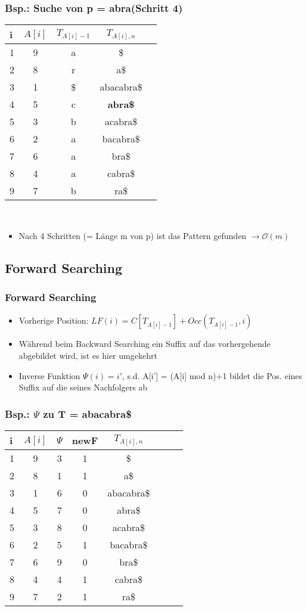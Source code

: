 \documentclass{beamer}
\begin{document}
\begin{frame}
\frametitle{Bsp.: Suche von p = \glqq abra\grqq  (Schritt 4)}
\begin{tabular}{l<{\ttfamily}|c<{\ttfamily} c<{\ttfamily}c<{\ttfamily} l<{\ttfamily}}
\textbf{i} & $A[i]$ & $T_{A[i]-1}$ & $T_{A[i],n}$\\\hline
1 & 9 & a & \$ \\
2 & 8 & r & a\$ \\
3 & 1 & \$ & abacabra\$ \\
4 & 5 & c & \color{red}\textbf{abra\$} \\
5 & 3 & b & acabra\$ \\
6 & 2 & a & bacabra\$ \\
7 & 6 & a & bra\$ \\
8 & 4 & a & cabra\$ \\
9 & 7 & b & ra\$ \\
\end{tabular}\\[5mm]
\begin{itemize}
\item Nach 4 Schritten (= Länge m von p) ist das Pattern gefunden $\rightarrow \mathcal{O}(m)$
\end{itemize}
\end{frame}
\begin{frame}
\subsection{Forward Searching}
\frametitle{Forward Searching}
\begin{itemize}
\item Vorherige Position: $LF(i) = C[T_{A[i]-1}] + Occ(T_{A[i]-1},i)$
\item Während beim Backward Searching ein Suffix auf das vorhergehende abgebildet wird, ist es hier umgekehrt
\item Inverse Funktion $\Psi(i) = i'$, s.d. A[i'] = (A[i] mod n)+1 bildet die Pos. eines Suffix auf die seines Nachfolgers ab
\end{itemize}
\end{frame}
\begin{frame}
\frametitle{Bsp.: $\Psi$ zu T = \glqq abacabra\$\grqq}
\begin{tabular}{l<{\ttfamily}|c<{\ttfamily} c<{\ttfamily}c<{\ttfamily} c<{\ttfamily}c<{\ttfamily}c<{\ttfamily} r<{\ttfamily}}
i & $A[i]$ & $\Psi$ & newF & $T_{A[i],n}$ \\\hline
1 & 9 & 3 & 1 &\$\\
2 & 8 & 1 & 1 &a\$\\
3 & 1 & 6 & 0 &abacabra\$\\
4 & 5 & 7 & 0 &abra\$\\
5 & 3 & 8 & 0 &acabra\$\\
6 & 2 & 5 & 1 &bacabra\$\\
7 & 6 & 9 & 0 &bra\$\\
8 & 4 & 4 & 1 &cabra\$\\
9 & 7 & 2 & 1 &ra\$\\
\end{tabular}
\end{frame}
\end{document}
